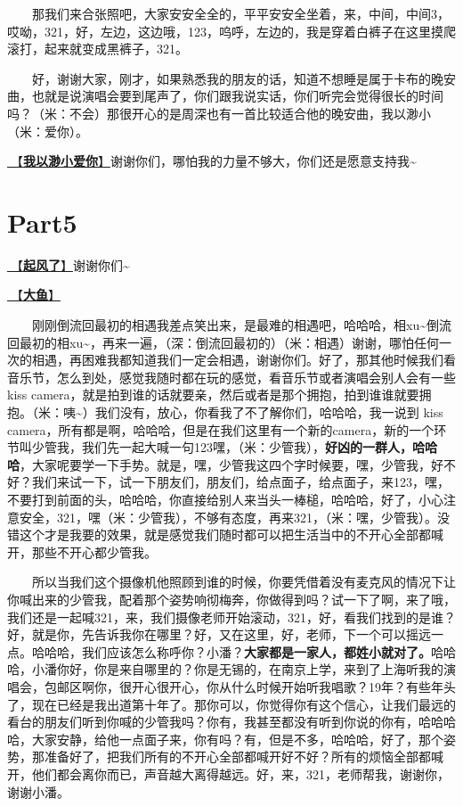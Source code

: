 \documentclass[]{ctexbook}
\begin{document}
  那我们来合张照吧，大家安安全全的，平平安安全坐着，来，中间，中间3，哎呦，321，好，左边，这边哦，123，呜呼，左边的，我是穿着白裤子在这里摸爬滚打，起来就变成黑裤子，321。

  好，谢谢大家，刚才，如果熟悉我的朋友的话，知道不想睡是属于卡布的晚安曲，也就是说演唱会要到尾声了，你们跟我说实话，你们听完会觉得很长的时间吗？（米：不会）那很开心的是周深也有一首比较适合他的晚安曲，我以渺小（米：爱你）。

\hyperref[loving-you-in-my-humble-way]{🎵【\textbf{我以渺小爱你}】}谢谢你们，哪怕我的力量不够大，你们还是愿意支持我\textasciitilde{}

\section{Part5}\label{shanghai-20240518-part5}

\hyperref[the-wind-rises]{🎵【\textbf{起风了}】}谢谢你们\textasciitilde{}

\hyperref[big-fish]{🎵【\textbf{大鱼}】}

  刚刚倒流回最初的相遇我差点笑出来，是最难的相遇吧，哈哈哈，相xu\textasciitilde 倒流回最初的相xu\textasciitilde，再来一遍，（深：倒流回最初的）（米：相遇）谢谢，哪怕任何一次的相遇，再困难我都知道我们一定会相遇，谢谢你们。好了，那其他时候我们看音乐节，怎么到处，感觉我随时都在玩的感觉，看音乐节或者演唱会别人会有一些kiss camera，就是拍到谁的话就要亲，然后或者是那个拥抱，拍到谁谁就要拥抱。（米：咦\textasciitilde）我们没有，放心，你看我了不了解你们，哈哈哈，我一说到 kiss camera，所有都是啊，哈哈哈，但是在我们这里有一个新的camera，新的一个环节叫少管我，我们先一起大喊一句123嘿，（米：少管我），\textbf{好凶的一群人，哈哈哈}，大家呢要学一下手势。就是，嘿，少管我这四个字时候要，嘿，少管我，好不好？我们来试一下，试一下朋友们，朋友们，给点面子，给点面子，来123，嘿，不要打到前面的头，哈哈哈，你直接给别人来当头一棒槌，哈哈哈，好了，小心注意安全，321，嘿（米：少管我），不够有态度，再来321，（米：嘿，少管我）。没错这个才是我要的效果，就是感觉我们随时都可以把生活当中的不开心全部都喊开，那些不开心都少管我。

  所以当我们这个摄像机他照顾到谁的时候，你要凭借着没有麦克风的情况下让你喊出来的少管我，配着那个姿势响彻梅奔，你做得到吗？试一下了啊，来了哦，我们还是一起喊321，来，我们摄像老师开始滚动，321，好，看我们找到的是谁？好，就是你，先告诉我你在哪里？好，又在这里，好，老师，下一个可以摇远一点。哈哈哈，我们应该怎么称呼你？小潘？\textbf{大家都是一家人，都姓小就对了。}哈哈哈，小潘你好，你是来自哪里的？你是无锡的，在南京上学，来到了上海听我的演唱会，包邮区啊你，很开心很开心，你从什么时候开始听我唱歌？19年？有些年头了，现在已经是我出道第十年了。那你可以，你觉得你有这个信心，让我们最远的看台的朋友们听到你喊的少管我吗？你有，我甚至都没有听到你说的你有，哈哈哈哈，大家安静，给他一点面子来，你有吗？有，但是不多，哈哈哈，好了，那个姿势，那准备好了，把我们所有的不开心全部都喊开好不好？所有的烦恼全部都喊开，他们都会离你而已，声音越大离得越远。好，来，321，老师帮我，谢谢你，谢谢小潘。
\end{document}
